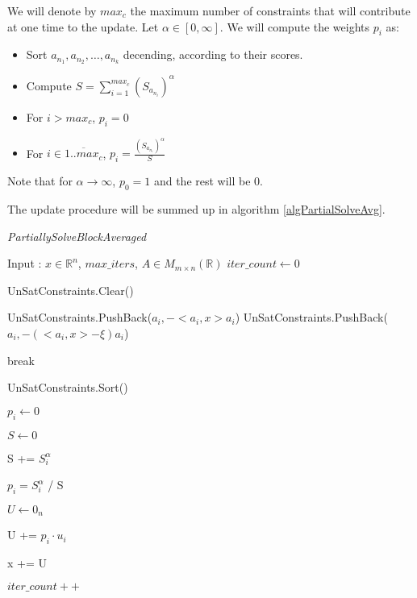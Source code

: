 \documentclass[a4paper,twoside,10pt]{report}
\begin{document}
	We will denote by \(max_c\) the maximum number of constraints that will contribute at one time to the update. Let \(\alpha \in [0, \infty]\). We will compute the weights \(p_i\) as:
	
	\begin{itemize}
		\item Sort \(a_{n_1}, a_{n_2},\ldots, a_{n_k}\) decending, according to their scores.
		\item Compute \(S = \sum^{max_c}_{i = 1} {(S_{a_{n_i}})^\alpha}\)
		\item For \(i > max_c\), \(p_i = 0\)
		\item For \(i \in \overline{1..max_c}\), \(p_i = \frac{(S_{a_{n_i}})^\alpha}{S}\)
	\end{itemize}
	
	Note that for \(\alpha \rightarrow \infty\), \(p_0 = 1\) and the rest will be 0.
	
	The update procedure will be summed up in algorithm \ref{algPartialSolveAvg}.
	
	\begin{algorithm}
	\caption{\textit{PartiallySolveBlockAveraged}}
	\label{algPartialSolveAvg}
	\begin{center}
	\begin{algorithmic}
	
	\STATE Input : \(x\in \mathbb{R}^n\), \(max\_iters\), \(A\in M_{m\times n}(\mathbb{R})\)
	\STATE \(iter\_count \gets 0\)
	
	
		\STATE UnSatConstraints.Clear()
		
				\STATE UnSatConstraints.PushBack(\(a_i, -<a_i, x> a_i\))
			\ELSE
					\STATE UnSatConstraints.PushBack(\(a_i, -(<a_i, x> - \xi)a_i\))
				\ENDIF
			\ENDIF
		\ENDFOR
		
			\STATE break
		\ENDIF 
		
		\STATE UnSatConstraints.Sort()
		
			\STATE \(p_i \gets 0\)
		\ENDFOR
		
		\STATE \(S \gets 0\)
		
			\STATE S += \(S_i ^\alpha\)
		\ENDFOR
		
			\STATE \(p_i = S_i ^\alpha\) / S
		\ENDFOR
		
		\STATE \(U \gets 0_n\)
		
			\STATE U += \(p_i \cdot u_i\)
		\ENDFOR
		
		\STATE x += U
	
		\STATE \(iter\_count ++\)
	\ENDWHILE

	\end{algorithmic}
	\end{center}
	\end{algorithm}			
	
\end{document}
